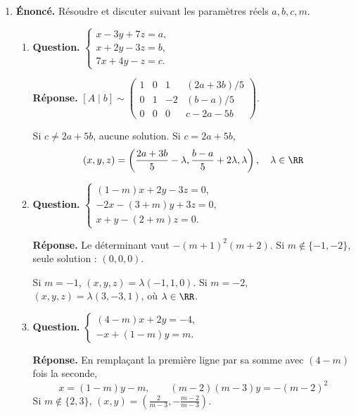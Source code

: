 \documentclass[12pt, a4paper]{article}
\begin{document}
\begin{enumerate}[label=3.\arabic*., start=25]
\begin{minipage}[t]{\linewidth}
\begin{enumerate}[label=\arabic*.,start=4]
\end{enumerate}

\end{minipage}

  \item \begin{minipage}[t]{\linewidth}\raggedright
\textbf{Énoncé.} Résoudre et discuter suivant les paramètres réels $a,b,c,m$.

\begin{enumerate}[\arabic*.]
        \item \textbf{Question.} $\displaystyle\begin{cases}x-3y+7z=a,\\x+2y-3z=b,\\7x+4y-z=c.\end{cases}$
\par\smallskip
\textbf{Réponse.} $\displaystyle [A\mid b]\sim\begin{pmatrix}1&0&1&(2a+3b)/5\\0&1&-2&(b-a)/5\\0&0&0&c-2a-5b\end{pmatrix}$.

        Si $c\neq2a+5b$, aucune solution. Si $c=2a+5b$,
        \[
          (x,y,z)=\left(\frac{2a+3b}5-\lambda,\frac{b-a}5+2\lambda,\lambda\right),\quad\lambda\in\RR
        \]

  \item \textbf{Question.} $\displaystyle\begin{cases}(1-m)x+2y-3z=0,\\-2x-(3+m)y+3z=0,\\x+y-(2+m)z=0.\end{cases}$
\par\smallskip
\textbf{Réponse.} Le déterminant vaut $-(m+1)^2(m+2)$.
        Si $m\notin\{-1,-2\}$, seule solution : $(0,0,0)$.

        Si $m=-1$, $(x,y,z)=\lambda(-1,1,0)$.
        Si $m=-2$, $(x,y,z)=\lambda(3,-3,1)$, où $\lambda\in\RR$.

  \item \textbf{Question.} $\displaystyle\begin{cases}(4-m)x+2y=-4,\\-x+(1-m)y=m.\end{cases}$
\par\smallskip
\textbf{Réponse.} En remplaçant la première ligne par sa somme avec $(4-m)$ fois la seconde,
        \[
          x=(1-m)y-m,\qquad (m-2)(m-3)y=-(m-2)^2
        \]
        Si $m\notin\{2,3\}$, $(x,y)=\left(\frac2{m-3},-\frac{m-2}{m-3}\right)$.


\end{enumerate}
\end{minipage}
\end{enumerate}
\end{document}
